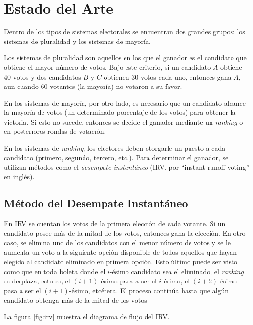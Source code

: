 \chapter{Estado del Arte}\label{chapter:state-of-the-art}

Dentro de los tipos de sistemas electorales se encuentran dos grandes grupos: los sistemas de pluralidad y los sistemas de mayor\'ia. 

Los sistemas de pluralidad son aquellos en los que el ganador es el candidato que obtiene el mayor n\'umero de votos. Bajo este  criterio, si un candidato $A$ obtiene $40$ votos y dos candidatos $B$ y $C$ obtienen $30$ votos cada uno, entonces gana $A$, aun cuando $60$ votantes (la mayor\'ia) no votaron a su favor. 

En los sistemas de mayor\'ia, por otro lado, es necesario que un candidato alcance la mayor\'ia de votos (un determinado porcentaje de los votos) para obtener la victoria. Si esto no sucede, entonces se decide el ganador mediante un \textit{ranking} o en posteriores rondas de votaci\'on.

En los sistemas de \textit{ranking}, los electores deben otorgarle un puesto a cada candidato (primero, segundo, tercero, etc.).  Para determinar el ganador, se utilizan m\'etodos como el \textit{desempate instant\'aneo} (IRV, por ``instant-runoff voting'' en ingl\'es). 

\section{M\'etodo del Desempate Instant\'aneo}\label{sec:irv}
En IRV se cuentan los votos de la primera elecci\'on de cada votante. Si un candidato posee m\'as de la mitad de  los votos, entonces gana la elecci\'on. En otro caso, se elimina uno de los candidatos con el menor n\'umero de votos y se le aumenta un voto a la siguiente opci\'on disponible de todos aquellos que hayan elegido al candidato eliminado en primera opci\'on. Esto \'ultimo puede ser visto como que en toda boleta donde el $i$-\'esimo candidato sea el eliminado, el \textit{ranking} se desplaza, esto es, el $(i+1)$-\'esimo pasa a ser el $i$-\'esimo, el $(i+2)$-\'esimo pasa a ser el $(i+1)$-\'esimo, etc\'etera. El proceso contin\'ua hasta que alg\'un candidato obtenga m\'as de la mitad de los votos. 

La figura \ref{fig:irv} muestra el diagrama de flujo del IRV.

